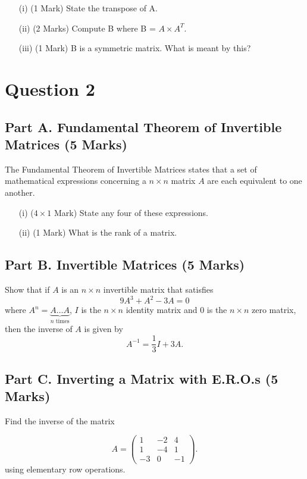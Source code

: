 \documentclass[a4paper,12pt]{article}
\begin{document}
		\begin{itemize}
			\item[(i)] (1 Mark) State the transpose of A.
			\item[(ii)] (2 Marks) Compute B where B = $ A \times A^{T}$. 
			\item[(iii)] (1 Mark) B is a symmetric matrix. What is meant by this?
		\end{itemize}
\newpage
\section*{Question 2}
	\subsection*{Part A. Fundamental Theorem of Invertible Matrices (5 Marks)}
	The Fundamental Theorem of Invertible Matrices states that a set of mathematical expressions concerning a $n\times n$ matrix $A$ are each equivalent to one another.
	
	\begin{itemize}
		\item[(i)] ($4 \times 1$ Mark)
		State any four of these expressions.
		\item[(ii)] (1 Mark) What is the rank of a matrix.
	\end{itemize}
	\subsection*{Part B. Invertible Matrices (5 Marks)}	
	\noindent	Show that if $A$ is an $n\times n$ invertible matrix that satisfies 
	$$
	9A^3+A^2-3A=0
	$$
	where $A^n=\underbrace{A\ldots A}_{\textrm{$n$ times}}$, %
	$I$ is the $n\times n$  identity matrix and $0$ is the $n\times n$  zero matrix,
	then the inverse of $A$ is given by  %
	$$
	A^{-1}=\frac13I+3A.
	$$
	\subsection*{Part C. Inverting a Matrix with E.R.O.s (5 Marks)}	
	Find the inverse of the  matrix 
	
	\begin{equation*}
	A=\left( \begin{array}{rrr}
	1 & -2 & 4\\
	1 & -4 & 1\\
	-3 & 0 & -1
	\end{array} \right).
	\end{equation*}
	using elementary row operations.
\end{document}
